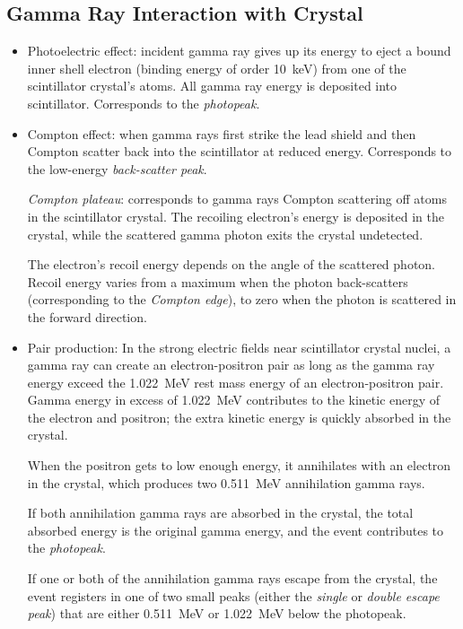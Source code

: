 \documentclass[11pt, a4paper]{article}
\begin{document}
\subsection{Gamma Ray Interaction with Crystal}
\begin{itemize}
	\item Photoelectric effect: incident gamma ray gives up its energy to eject a bound inner shell electron (binding energy of order \SI{10}{\kilo \electronvolt}) from one of the scintillator crystal's atoms. All gamma ray energy is deposited into scintillator. Corresponds to the \textit{photopeak}.
	
	\item Compton effect: when gamma rays first strike the lead shield and then Compton scatter back into the scintillator at reduced energy. Corresponds to the low-energy \textit{back-scatter peak}.
	
	\textit{Compton plateau}: corresponds to gamma rays Compton scattering off atoms in the scintillator crystal. The recoiling electron’s energy is deposited in the crystal, while the scattered gamma photon exits the crystal undetected.
	
	The electron's recoil energy depends on the angle of the scattered photon. Recoil energy varies from a maximum when the photon back-scatters (corresponding to the \textit{Compton edge}), to zero when the photon is scattered in the forward direction.
	
	\item Pair production: In the strong electric fields near scintillator crystal nuclei, a gamma ray can create an electron-positron pair as long as the gamma ray energy exceed the \SI{1.022}{\mega \electronvolt} rest mass energy of an electron-positron pair. Gamma energy in excess of \SI{1.022}{\mega \electronvolt} contributes to the kinetic energy of the electron and positron; the extra kinetic energy is quickly absorbed in the crystal.
	
	When the positron gets to low enough energy, it annihilates with an electron in the crystal, which produces two \SI{0.511}{\mega \electronvolt} annihilation gamma rays.
	
	If both annihilation gamma rays are absorbed in the crystal, the total absorbed energy is the original gamma energy, and the event contributes to the \textit{photopeak}.
	
	If one or both of the annihilation gamma rays escape from the crystal, the event registers in one of two small peaks (either the \textit{single} or \textit{double escape peak}) that are either \SI{0.511}{\mega \electronvolt} or \SI{1.022}{\mega \electronvolt} below the photopeak.
\end{itemize}
\end{document}
